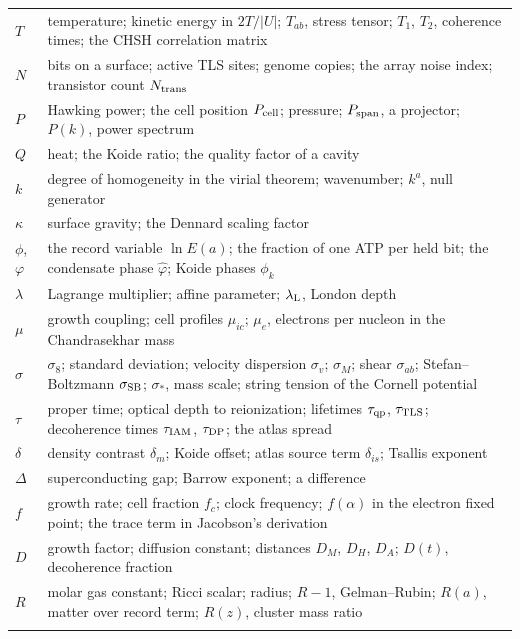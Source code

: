{\begin{longtable}{@{}>{\raggedright\arraybackslash}p{}>{\raggedright\arraybackslash}p{}@{}}
$T$ & temperature; kinetic energy in $2T/|U|$; $T_{ab}$, stress tensor; $T_1$, $T_2$, coherence times; the CHSH correlation matrix\\\iamrowrule
$N$ & bits on a surface; active TLS sites; genome copies; the array noise index; transistor count $N_{\rm trans}$\\\iamrowrule
$P$ & Hawking power; the cell position $P_{\rm cell}$; pressure; $P_{\rm span}$, a projector; $P(k)$, power spectrum\\\iamrowrule
$Q$ & heat; the Koide ratio; the quality factor of a cavity\\\iamrowrule
$k$ & degree of homogeneity in the virial theorem; wavenumber; $k^a$, null generator\\\iamrowrule
$\kappa$ & surface gravity; the Dennard scaling factor\\\iamrowrule
$\phi$, $\varphi$ & the record variable $\ln E(a)$; the fraction of one ATP per held bit; the condensate phase $\hat\varphi$; Koide phases $\phi_k$\\\iamrowrule
$\lambda$ & Lagrange multiplier; affine parameter; $\lambda_{\mathrm L}$, London depth\\\iamrowrule
$\mu$ & growth coupling; cell profiles $\mu_{ic}$; $\mu_e$, electrons per nucleon in the Chandrasekhar mass\\\iamrowrule
$\sigma$ & $\sigma_8$; standard deviation; velocity dispersion $\sigma_v$; $\sigma_M$; shear $\sigma_{ab}$; Stefan--Boltzmann $\sigma_{\rm SB}$; $\sigma_*$, mass scale; string tension of the Cornell potential\\\iamrowrule
$\tau$ & proper time; optical depth to reionization; lifetimes $\tau_{\mathrm{qp}}$, $\tau_{\mathrm{TLS}}$; decoherence times $\tau_{\rm IAM}$, $\tau_{\rm DP}$; the atlas spread\\\iamrowrule
$\delta$ & density contrast $\delta_m$; Koide offset; atlas source term $\delta_{is}$; Tsallis exponent\\\iamrowrule
$\Delta$ & superconducting gap; Barrow exponent; a difference\\\iamrowrule
$f$ & growth rate; cell fraction $f_c$; clock frequency; $f(\alpha)$ in the electron fixed point; the trace term in Jacobson's derivation\\\iamrowrule
$D$ & growth factor; diffusion constant; distances $D_M$, $D_H$, $D_A$; $D(t)$, decoherence fraction\\\iamrowrule
$R$ & molar gas constant; Ricci scalar; radius; $R-1$, Gelman--Rubin; $R(a)$, matter over record term; $R(z)$, cluster mass ratio\\\iamrowrule

\end{longtable}}
